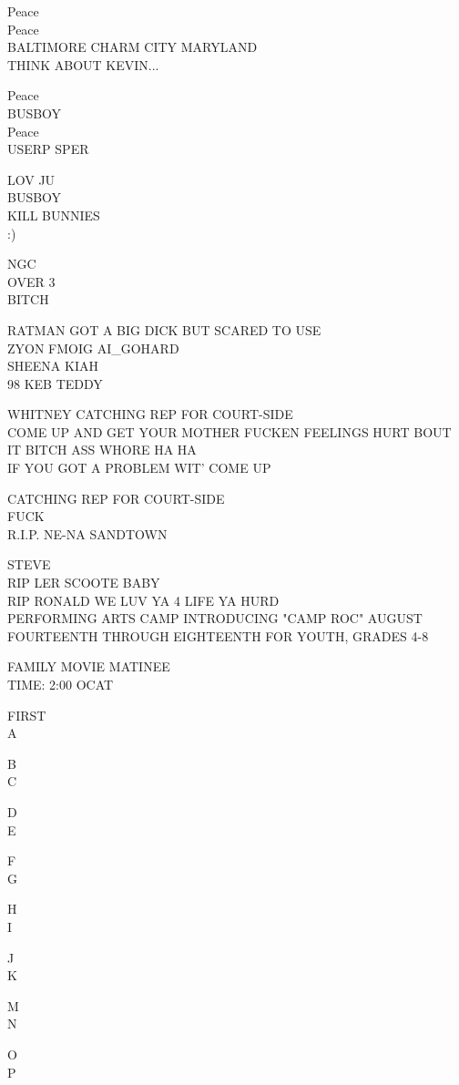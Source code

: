 \documentclass[10pt,letterpaper]{article}
\begin{document}
Peace\\
Peace\\
BALTIMORE CHARM CITY MARYLAND\\
THINK ABOUT KEVIN...

Peace\\
BUSBOY\\
Peace\\
USERP SPER

LOV JU\\
BUSBOY\\
KILL BUNNIES\\
:)

NGC\\
OVER 3\\
BITCH

RATMAN GOT A BIG DICK BUT SCARED TO USE\\
ZYON FMOIG AI\_GOHARD\\
SHEENA KIAH\\
98 KEB TEDDY

WHITNEY CATCHING REP FOR COURT{-}SIDE\\
COME UP AND GET YOUR MOTHER FUCKEN FEELINGS HURT BOUT IT BITCH ASS WHORE HA HA\\
IF YOU GOT A PROBLEM WIT' COME UP

CATCHING REP FOR COURT{-}SIDE\\
FUCK\\
R.I.P. NE{-}NA SANDTOWN

STEVE\\
RIP LER SCOOTE BABY\\
RIP RONALD WE LUV YA 4 LIFE YA HURD\\
PERFORMING ARTS CAMP INTRODUCING "CAMP ROC" AUGUST FOURTEENTH THROUGH EIGHTEENTH FOR YOUTH, GRADES 4{-}8

FAMILY MOVIE MATINEE\\
TIME: 2:00 OCAT

FIRST\\
A

B\\
C

D\\
E

F\\
G

H\\
I

J\\
K

M\\
N

O\\
P
\end{document}
